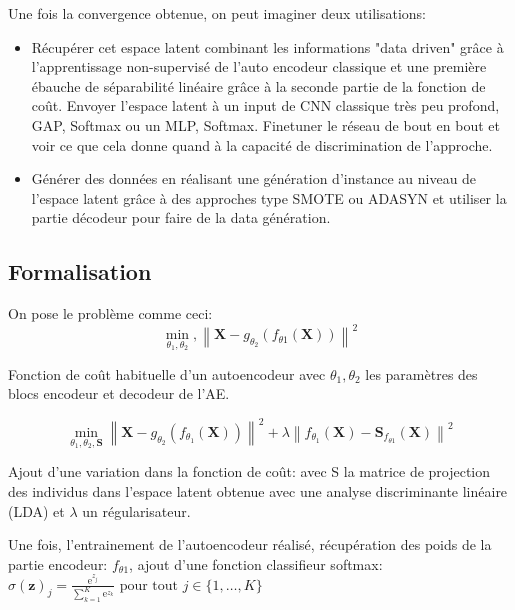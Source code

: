 Une fois la convergence obtenue, on peut imaginer deux utilisations:
\begin{itemize}
    \item Récupérer cet espace latent combinant les informations "data driven" grâce à l'apprentissage non-supervisé de l'auto encodeur classique et une première ébauche de séparabilité linéaire grâce à la seconde partie de la fonction de coût. Envoyer l'espace latent à un input de CNN classique très peu profond, GAP, Softmax ou un MLP, Softmax. Finetuner le réseau de bout en bout et voir ce que cela donne quand à la capacité de discrimination de l'approche. 
    \item Générer des données en réalisant une génération d'instance au niveau de l'espace latent grâce à des approches type SMOTE \cite{chawla2002smote} ou ADASYN \cite{he2008adasyn}  et utiliser la partie décodeur pour  faire de la data génération.
\end{itemize}

\subsection{Formalisation}
On pose le problème comme ceci: \newline
$$\min _{\theta_{1}, \theta_{2}},\left\|\mathbf{X}-g_{\theta_{2}}\left(f_{\theta 1}(\mathbf{X})\right)\right\|^{2}$$

Fonction de coût habituelle d'un autoencodeur avec $\theta_{1}, \theta_{2}$ les paramètres des blocs encodeur et decodeur de l’AE. 

$$\min _{\theta_{1}, \theta_{2}, \mathbf{S}}\left\|\mathbf{X}-g_{\theta_{2}}\left(f_{\theta_{1}}(\mathbf{X})\right)\right\|^{2}+\lambda\left\|f_{\theta_{1}}(\mathbf{X})-\mathbf{S}_{f_{\theta 1}}(\mathbf{X})\right\|^{2}$$

Ajout d'une variation dans la fonction de coût: avec S la matrice de projection des individus dans l'espace latent obtenue avec une analyse discriminante linéaire (LDA) et $\lambda$ un régularisateur.

Une fois, l'entrainement de l'autoencodeur réalisé, récupération des poids de la partie encodeur: $f_{\theta 1}$, ajout d'une fonction classifieur softmax:\\ 

$\sigma(\mathbf{z})_{j}=\frac{\mathrm{e}^{z_{j}}}{\sum_{k=1}^{K} \mathrm{e}^{z_{k}}} \text { pour  tout } j \in\{1, \ldots, K\}$


